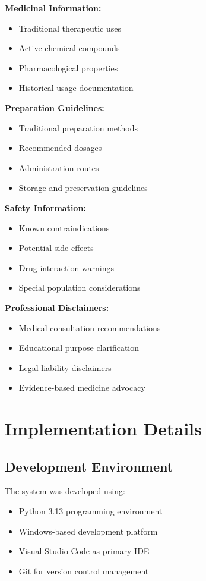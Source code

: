 \documentclass[conference]{IEEEtran}
\begin{document}
\textbf{Medicinal Information:}
\begin{itemize}
\item Traditional therapeutic uses
\item Active chemical compounds
\item Pharmacological properties
\item Historical usage documentation
\end{itemize}

\textbf{Preparation Guidelines:}
\begin{itemize}
\item Traditional preparation methods
\item Recommended dosages
\item Administration routes
\item Storage and preservation guidelines
\end{itemize}

\textbf{Safety Information:}
\begin{itemize}
\item Known contraindications
\item Potential side effects
\item Drug interaction warnings
\item Special population considerations
\end{itemize}

\textbf{Professional Disclaimers:}
\begin{itemize}
\item Medical consultation recommendations
\item Educational purpose clarification
\item Legal liability disclaimers
\item Evidence-based medicine advocacy
\end{itemize}

\section{Implementation Details}

\subsection{Development Environment}

The system was developed using:
\begin{itemize}
\item Python 3.13 programming environment
\item Windows-based development platform
\item Visual Studio Code as primary IDE
\item Git for version control management
\end{itemize}
\end{document}
